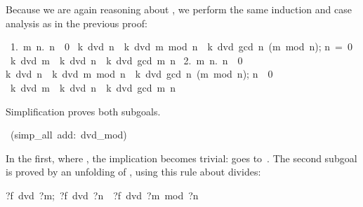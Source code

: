Because we are again reasoning about , we perform the same
induction and case analysis as in the previous proof:
\begingroup\samepage
\begin{isabelle}
\ 1.\ \isasymAnd m\ n.\ \isasymlbrakk n\ \isasymnoteq \ 0\ \isasymLongrightarrow \isanewline
{}k\ dvd\ n\ \isasymlongrightarrow \ k\ dvd\ m\ mod\ n\ \isasymlongrightarrow \ k\ dvd\ gcd\ n\ (m\ mod\ n);\isanewline
{}n\ =\ 0\isasymrbrakk \isanewline
{}\isasymLongrightarrow \ k\ dvd\ m\ \isasymlongrightarrow \ k\ dvd\ n\ \isasymlongrightarrow \ k\ dvd\ gcd\ m\ n\isanewline
\ 2.\ \isasymAnd m\ n.\ \isasymlbrakk n\ \isasymnoteq \ 0\ \isasymLongrightarrow \isanewline
{}k\ dvd\ n\ \isasymlongrightarrow \ k\ dvd\ m\ mod\ n\ \isasymlongrightarrow \ k\ dvd\ gcd\ n\ (m\ mod\ n);\isanewline
{}n\ \isasymnoteq \ 0\isasymrbrakk \isanewline
{}\isasymLongrightarrow \ k\ dvd\ m\ \isasymlongrightarrow \ k\ dvd\ n\ \isasymlongrightarrow \ k\ dvd\ gcd\ m\ n%
\end{isabelle}
\endgroup

\noindent Simplification proves both subgoals. 
\begin{isabelle}
\ (simp_all\ add:\ dvd_mod)\isanewline
{}
\end{isabelle}
In the first, where , the implication becomes trivial:  goes to~.  The second subgoal is proved by
an unfolding of \isa{gcd}, using this rule about divides:
\begin{isabelle}
\isasymlbrakk ?f\ dvd\ ?m;\ ?f\ dvd\ ?n\isasymrbrakk \
\isasymLongrightarrow \ ?f\ dvd\ ?m\ mod\ ?n%
\rulename{dvd_mod}
\end{isabelle}


